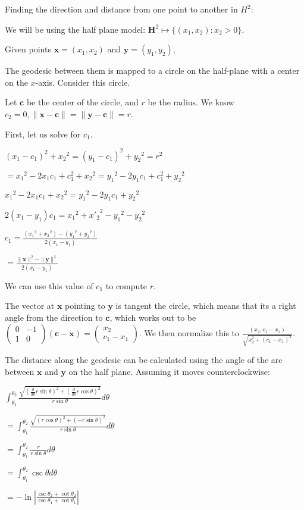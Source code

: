 \documentclass[12pt]{amsart}
\newcommand{\mat}[4]{\left(\begin{array}{ccc} #1 & #2 \\#3 & #4 \end{array} \right)}
\newcommand{\vect}[2]{\left(\begin{array}{ccc} #1 \\#2 \end{array} \right)}
\begin{document}
Finding the direction and distance from one point to another in $H^2$:

We will be using the half plane model: $\textbf{H}^2 \mapsto \{(x_1,x_2):x_2 > 0\}$.

Given points $\textbf{x} = (x_1,x_2)$ and $\textbf{y} = (y_1,y_2)$,

The geodesic between them is mapped to a circle on the half-plane with a center on the $x$-axis. Consider this circle.

Let $\textbf{c}$ be the center of the circle, and $r$ be the radius. We know $c_2 = 0, \|\textbf{x}-\textbf{c}\| = \|\textbf{y}-\textbf{c}\| = r$.

First, let us solve for $c_1$.

$(x_1-c_1)^2+{x_2}^2 = (y_1-c_1)^2+{y_2}^2 = r^2$

$= {x_1}^2-2x_1c_1+c_1^2+{x_2}^2 = {y_1}^2-2y_1c_1+c_1^2+{y_2}^2$

${x_1}^2-2x_1c_1+{x_2}^2 = {y_1}^2-2y_1c_1+{y_2}^2$

$2(x_1-y_1)c_1 = {x_1}^2+{x'_2}^2-{y_1}^2-{y_2}^2$

$c_1 = \frac{({x_1}^2+{x_2}^2)-({y_1}^2+{y_2}^2)}{2(x_1-y_1)}$

$= \frac{\|\textbf{x}\|^2-\|\textbf{y}\|^2}{2(x_1-y_1)}$

We can use this value of $c_1$ to compute $r$.

The vector at $\textbf{x}$ pointing to $\textbf{y}$ is tangent the circle, which means that its a right angle from the direction to $\textbf{c}$, which works out to be $\mat{0}{-1}{1}{0}(\textbf{c}-\textbf{x}) = \vect{x_2}{c_1-x_1}$. We then normalize this to $\frac{(x_2,c_1-x_1)}{\sqrt{x_2^2+(c_1-x_1)^2}}$.

The distance along the geodesic can be calculated using the angle of the arc between $\textbf{x}$ and $\textbf{y}$ on the half plane. Assuming it moves counterclockwise:

$\int_{\theta_1}^{\theta_2} \frac{\sqrt{(\frac{d}{d\theta}r\sin\theta)^2+(\frac{d}{d\theta}r\cos\theta)^2}}{r\sin\theta} d\theta$

$= \int_{\theta_1}^{\theta_2} \frac{\sqrt{(r\cos\theta)^2+(-r\sin\theta)^2}}{r\sin\theta} d\theta$

$= \int_{\theta_1}^{\theta_2} \frac{r}{r\sin\theta} d\theta$

$= \int_{\theta_1}^{\theta_2} \csc\theta d\theta$

$= -\ln\left|\frac{\csc\theta_2+\cot\theta_2}{\csc\theta_1+\cot\theta_1}\right|$
\end{document}
